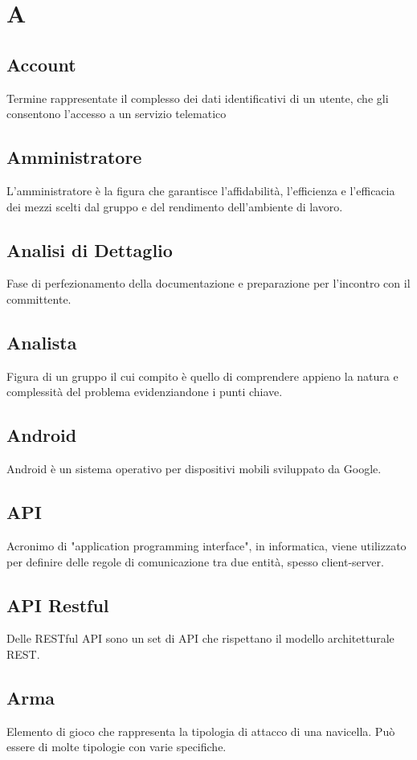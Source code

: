 \section{A}
	\subsection{Account}
		Termine rappresentate il complesso dei dati identificativi di un utente, che gli consentono l'accesso a un servizio telematico
	\subsection{Amministratore}  
		L'amministratore è la figura che garantisce l’affidabilità, l’efficienza e l’efficacia dei mezzi scelti dal gruppo e del rendimento dell’ambiente di lavoro.
	\subsection{Analisi di Dettaglio}
		Fase di perfezionamento della documentazione e preparazione per l'incontro con il committente.
	\subsection{Analista}  
		Figura di un gruppo il cui compito è quello di comprendere appieno la natura e complessità del problema evidenziandone i punti chiave.
    \subsection{Android}
        Android è un sistema operativo per dispositivi mobili sviluppato da Google.
	\subsection{API}  
		Acronimo di "application programming interface", in informatica, viene utilizzato per definire delle regole di comunicazione tra due entità, spesso client-server.
	\subsection{API Restful}  
		Delle RESTful API sono un set di API che rispettano il modello architetturale REST.
    \subsection{Arma}
        Elemento di gioco che rappresenta la tipologia di attacco di una navicella. Può essere di molte tipologie con varie specifiche.
